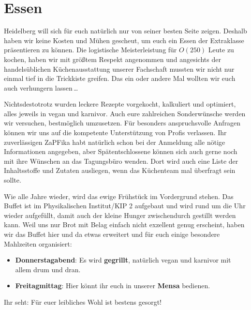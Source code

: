 
\section{Essen}
Heidelberg will sich für euch natürlich nur von seiner besten Seite zeigen. Deshalb haben wir keine Kosten und Mühen gescheut,  um euch ein Essen der Extraklasse präsentieren zu können. Die logistische Meisterleistung für $O(250)$ Leute zu kochen, haben wir mit größtem Respekt angenommen und angesichts der handelsüblichen Küchenausstattung unserer Fachschaft mussten wir nicht nur einmal tief in die Trickkiste greifen. Das ein oder andere Mal wollten wir euch auch verhungern lassen\,\dots

Nichtsdestotrotz wurden leckere Rezepte vorgekocht, kalkuliert und optimiert, alles jeweils in vegan und karnivor.  Auch eure zahlreichen Sonderwünsche werden wir versuchen, bestmöglich umzusetzen. Für besonders anspruchsvolle Anfragen können wir uns auf die kompetente Unterstützung von Profis verlassen. Ihr zuverlässigen ZaPFika habt natürlich schon bei der Anmeldung alle nötige Informationen angegeben, aber Spätentschlossene können sich auch gerne noch mit ihre Wünschen an das Tagungsbüro wenden. Dort wird auch eine Liste der Inhaltsstoffe und Zutaten ausliegen, wenn das Küchenteam mal überfragt sein sollte.

Wie alle Jahre wieder, wird das ewige Frühstück im Vordergrund stehen. Das Buffet ist im Physikalischen Institut/KIP 2 aufgebaut und wird rund um die Uhr wieder aufgefüllt, damit auch der kleine Hunger zwischendurch gestillt werden kann. Weil uns nur Brot mit Belag einfach nicht exzellent genug erscheint, haben wir das Buffet hier und da etwas erweitert und für euch einige besondere Mahlzeiten organisiert:
  \begin{itemize}    
    \item \textbf{Donnerstagabend}: Es wird \textbf{gegrillt}, natürlich vegan und karnivor mit allem drum und dran.
    \item \textbf{Freitagmittag}: Hier könnt ihr euch in unserer \textbf{Mensa} bedienen.
  \end{itemize}
  Ihr seht: Für euer leibliches Wohl ist bestens gesorgt! \\

